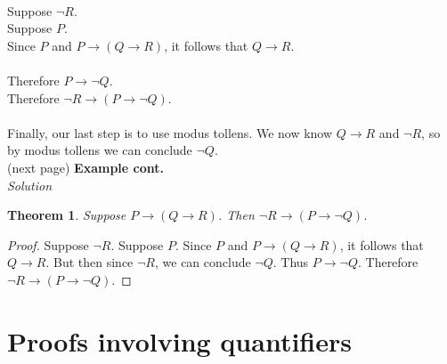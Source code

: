 \documentclass{report}
\newtheorem*{theorem}{Theorem}
\begin{document}
\vspace{1mm}\\
\indent Suppose $\neg R$.\\
\indent\indent Suppose $P$.\\
\indent\indent\indent Since $P$ and $P\to(Q\to R)$, it follows that $Q\to R$.\\
\indent\indent{}\\
\indent\indent Therefore $P\to\neg Q$.\\
\indent Therefore $\neg R\to(P\to\neg Q)$.\\
\vspace{1mm}\\
Finally, our last step is to use modus tollens. We now know $Q\to R$ and $\neg R$, so by modus tollens we can conclude $\neg Q$.\\
(next page)\newpage
\noindent\textbf{Example cont.}\\
\textit{Solution}
\begin{theorem}
Suppose $P\to(Q\to R)$. Then $\neg R\to(P\to\neg Q)$.
\end{theorem}
\begin{proof}
Suppose $\neg R$. Suppose $P$. Since $P$ and $P\to(Q\to R)$, it follows that $Q\to R$. But then since $\neg R$, we can conclude $\neg Q$. Thus
$P\to\neg Q$. Therefore $\neg R\to(P\to\neg Q)$.
\end{proof}
\newpage

\section{Proofs involving quantifiers}
\end{document}

